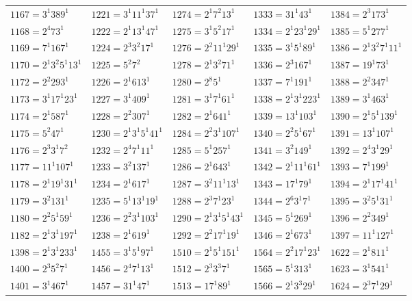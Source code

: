 {\begin{longtable}[c]{*{5}{l}}
$1167=3^{1}389^{1}$&$1221=3^{1}11^{1}37^{1}$&$1274=2^{1}7^{2}13^{1}$&$1333=31^{1}43^{1}$&$1384=2^{3}173^{1}$\\
$1168=2^{4}73^{1}$&$1222=2^{1}13^{1}47^{1}$&$1275=3^{1}5^{2}17^{1}$&$1334=2^{1}23^{1}29^{1}$&$1385=5^{1}277^{1}$\\
$1169=7^{1}167^{1}$&$1224=2^{3}3^{2}17^{1}$&$1276=2^{2}11^{1}29^{1}$&$1335=3^{1}5^{1}89^{1}$&$1386=2^{1}3^{2}7^{1}11^{1}$\\
$1170=2^{1}3^{2}5^{1}13^{1}$&$1225=5^{2}7^{2}$&$1278=2^{1}3^{2}71^{1}$&$1336=2^{3}167^{1}$&$1387=19^{1}73^{1}$\\
$1172=2^{2}293^{1}$&$1226=2^{1}613^{1}$&$1280=2^{8}5^{1}$&$1337=7^{1}191^{1}$&$1388=2^{2}347^{1}$\\
$1173=3^{1}17^{1}23^{1}$&$1227=3^{1}409^{1}$&$1281=3^{1}7^{1}61^{1}$&$1338=2^{1}3^{1}223^{1}$&$1389=3^{1}463^{1}$\\
$1174=2^{1}587^{1}$&$1228=2^{2}307^{1}$&$1282=2^{1}641^{1}$&$1339=13^{1}103^{1}$&$1390=2^{1}5^{1}139^{1}$\\
$1175=5^{2}47^{1}$&$1230=2^{1}3^{1}5^{1}41^{1}$&$1284=2^{2}3^{1}107^{1}$&$1340=2^{2}5^{1}67^{1}$&$1391=13^{1}107^{1}$\\
$1176=2^{3}3^{1}7^{2}$&$1232=2^{4}7^{1}11^{1}$&$1285=5^{1}257^{1}$&$1341=3^{2}149^{1}$&$1392=2^{4}3^{1}29^{1}$\\
$1177=11^{1}107^{1}$&$1233=3^{2}137^{1}$&$1286=2^{1}643^{1}$&$1342=2^{1}11^{1}61^{1}$&$1393=7^{1}199^{1}$\\
$1178=2^{1}19^{1}31^{1}$&$1234=2^{1}617^{1}$&$1287=3^{2}11^{1}13^{1}$&$1343=17^{1}79^{1}$&$1394=2^{1}17^{1}41^{1}$\\
$1179=3^{2}131^{1}$&$1235=5^{1}13^{1}19^{1}$&$1288=2^{3}7^{1}23^{1}$&$1344=2^{6}3^{1}7^{1}$&$1395=3^{2}5^{1}31^{1}$\\
$1180=2^{2}5^{1}59^{1}$&$1236=2^{2}3^{1}103^{1}$&$1290=2^{1}3^{1}5^{1}43^{1}$&$1345=5^{1}269^{1}$&$1396=2^{2}349^{1}$\\
$1182=2^{1}3^{1}197^{1}$&$1238=2^{1}619^{1}$&$1292=2^{2}17^{1}19^{1}$&$1346=2^{1}673^{1}$&$1397=11^{1}127^{1}$\\
\pagebreak
$1398=2^{1}3^{1}233^{1}$&$1455=3^{1}5^{1}97^{1}$&$1510=2^{1}5^{1}151^{1}$&$1564=2^{2}17^{1}23^{1}$&$1622=2^{1}811^{1}$\\
$1400=2^{3}5^{2}7^{1}$&$1456=2^{4}7^{1}13^{1}$&$1512=2^{3}3^{3}7^{1}$&$1565=5^{1}313^{1}$&$1623=3^{1}541^{1}$\\
$1401=3^{1}467^{1}$&$1457=31^{1}47^{1}$&$1513=17^{1}89^{1}$&$1566=2^{1}3^{3}29^{1}$&$1624=2^{3}7^{1}29^{1}$\\

\end{longtable}}
